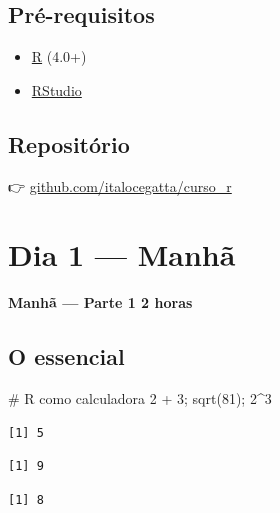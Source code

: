 \documentclass[
  letterpaper,
]{scrbook}
\newenvironment{Shaded}{\begin{snugshade}}{\end{snugshade}}
\newcommand{\CommentTok}[1]{\textcolor[rgb]{0.37,0.37,0.37}{#1}}
\newcommand{\DecValTok}[1]{\textcolor[rgb]{0.68,0.00,0.00}{#1}}
\newcommand{\FunctionTok}[1]{\textcolor[rgb]{0.28,0.35,0.67}{#1}}
\newcommand{\NormalTok}[1]{\textcolor[rgb]{0.00,0.23,0.31}{#1}}
\newcommand{\SpecialCharTok}[1]{\textcolor[rgb]{0.37,0.37,0.37}{#1}}
\providecommand{\tightlist}{%
  \setlength{\itemsep}{0pt}\setlength{\parskip}{0pt}}
\begin{document}
\section{Pré-requisitos}\label{pruxe9-requisitos-1}

\begin{itemize}
\tightlist
\item
  \href{https://cran.r-project.org/}{R} (4.0+)
\item
  \href{https://posit.co/download/rstudio-desktop/}{RStudio}
\end{itemize}

\section{Repositório}\label{reposituxf3rio-1}

👉
\href{https://github.com/italocegatta/curso_r}{github.com/italocegatta/curso\_r}

\chapter{Dia 1 --- Manhã}\label{dia-1-manhuxe3}

\textbf{Manhã --- Parte 1 \textbar{} 2 horas}

\section*{O essencial}\label{o-essencial}


\begin{Shaded}
\begin{Highlighting}[]
\CommentTok{\# R como calculadora}
\DecValTok{2} \SpecialCharTok{+} \DecValTok{3}\NormalTok{; }\FunctionTok{sqrt}\NormalTok{(}\DecValTok{81}\NormalTok{); }\DecValTok{2}\SpecialCharTok{\^{}}\DecValTok{3}
\end{Highlighting}
\end{Shaded}

\begin{verbatim}
[1] 5
\end{verbatim}

\begin{verbatim}
[1] 9
\end{verbatim}

\begin{verbatim}
[1] 8
\end{verbatim}
\end{document}
